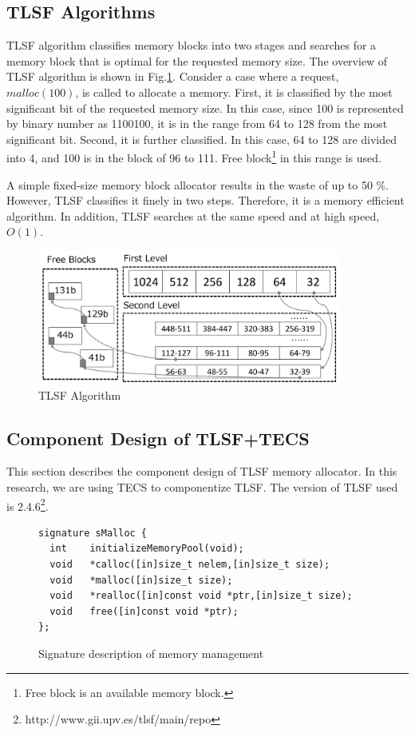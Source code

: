 \documentclass[a4j,12pt,oneside,openany,english]{jsbook}
\begin{document}
\subsection{TLSF Algorithms}

TLSF algorithm classifies memory blocks into two stages and searches for a memory block that is optimal for the requested memory size.
The overview of TLSF algorithm is shown in Fig.\ref{fig:TLSF}.
Consider a case where a request, $malloc(100)$, is called to allocate a memory.
First, it is classified by the most significant bit of the requested memory size.
In this case, since 100 is represented by binary number as 1100100, it is in the range from 64 to 128 from the most significant bit.
Second, it is further classified.
In this case, 64 to 128 are divided into 4, and 100 is in the block of 96 to 111.
Free block\footnote{Free block is an available memory block.} in this range is used.

A simple fixed-size memory block allocator results in the waste of up to 50 \%.
However, TLSF classifies it finely in two steps.
Therefore, it is a memory efficient algorithm.
In addition, TLSF searches at the same speed and at high speed, $O(1)$.


\begin{figure}[t]
    \centering
    \includegraphics[width=10cm,clip]{figure/TLSF.pdf}
    \caption{TLSF Algorithm}
    \label{fig:TLSF}
\end{figure}


\subsection{Component Design of TLSF+TECS}

This section describes the component design of TLSF memory allocator.
In this research, we are using TECS to componentize TLSF.
The version of TLSF used is 2.4.6\footnote{http://www.gii.upv.es/tlsf/main/repo}.

\begin{figure}[t]
\centering
\begin{lstlisting}
signature sMalloc {
  int    initializeMemoryPool(void);
  void   *calloc([in]size_t nelem,[in]size_t size);
  void   *malloc([in]size_t size);
  void   *realloc([in]const void *ptr,[in]size_t size);
  void   free([in]const void *ptr);
};
\end{lstlisting}
\caption{Signature description of memory management}  
\label{src:TLSFSignature}
\end{figure}
\end{document}
